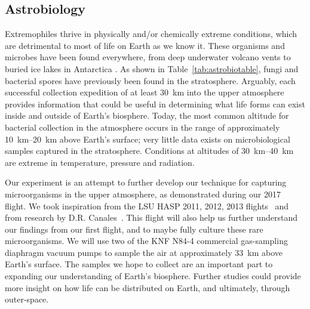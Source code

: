 \subsection{Astrobiology}
\label{sec:Astrobiology-Background}

Extremophiles thrive in physically and/or chemically extreme conditions, which are detrimental to most of life on Earth as we know it. These organisms and microbes have been found everywhere, from deep underwater volcano vents to buried ice lakes in Antarctica \cite{Extremophiles}.  As shown in Table~\ref{tab:astrobiotable}, fungi and bacterial spores have previously been found in the stratosphere. Arguably, each successful collection expedition of at least \SI{30}{\kilo\meter} into the upper atmosphere provides information that could be useful in determining what life forms can exist inside and outside of Earth's biosphere. Today, the most common altitude for bacterial collection in the atmosphere occurs in the range of approximately \SIrange{10}{20}{\kilo\meter} above Earth's surface; very little data exists on microbiological samples captured in the stratosphere. Conditions at altitudes of \SIrange{30}{40}{\kilo\meter} are extreme in temperature, pressure and radiation. 

	




Our experiment is an attempt to further develop our technique for capturing microorganisms in the upper atmosphere, as demonstrated during our 2017~\cite{SORA} flight.  We took inspiration from the LSU HASP 2011, 2012, 2013 flights~\cite{LSU} and from research by D.R. Canales~\cite{canales}.  This flight will also help us further understand our findings from our first flight, and to maybe fully culture these rare microorganisms. We will use two of the KNF N84-4 commercial gas-sampling diaphragm vacuum pumps to sample the air at approximately \SI{33}{\kilo\meter} above Earth's surface. The samples we hope to collect are an important part to expanding our understanding of Earth's biosphere. Further studies could provide more insight on how life can be distributed on Earth, and ultimately, through outer-space.

